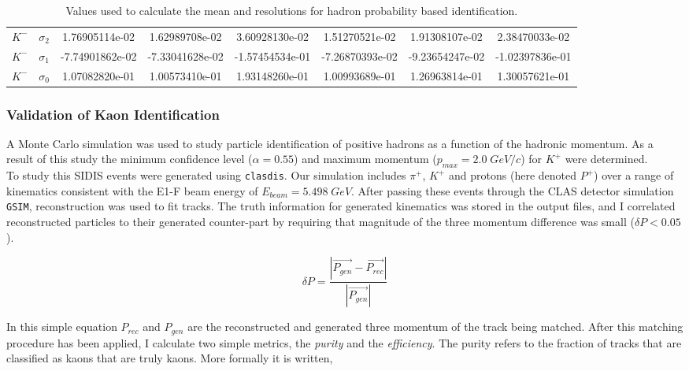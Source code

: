 \begin{landscape}
\begin{table}
\begin{tabular}{c|c|c|c|c|c|c|c}
    $K^-$ & $\sigma_2$ & 1.76905114e-02 &     1.62989708e-02 &     3.60928130e-02 &     1.51270521e-02 &     1.91308107e-02 &     2.38470033e-02 \\
    $K^-$ & $\sigma_1$ & -7.74901862e-02 &    -7.33041628e-02 &    -1.57454534e-01 &    -7.26870393e-02 &     -9.23654247e-02 &    -1.02397836e-01 \\
    $K^-$ & $\sigma_0$ & 1.07082820e-01 &     1.00573410e-01 &     1.93148260e-01 &     1.00993689e-01 &     1.26963814e-01 &     1.30057621e-01
  \end{tabular}
  \caption{Values used to calculate the mean and resolutions for hadron probability based identification.}
  \label{table-hadron-pdfs}
  \end{table}
\end{landscape}

%
%

\subsubsection{Validation of Kaon Identification}
A Monte Carlo simulation was used to study particle identification of positive hadrons as a function of the hadronic momentum.  As a result of this study the minimum confidence level ($\alpha = 0.55$) and maximum momentum ($p_{max} = 2.0 \; GeV/c$) for $K^+$ were determined. \\

To study this SIDIS events were generated using \texttt{clasdis}.  Our simulation includes $\pi^+$, $K^+$ and protons (here denoted $P^+$) over a range of kinematics consistent with the E1-F beam energy of $E_{beam} = 5.498 \; GeV$.  After passing these events through the CLAS detector simulation \texttt{GSIM}, reconstruction was used to fit tracks.  The truth information for generated kinematics was stored in the output files, and I correlated reconstructed particles to their generated counter-part by requiring that magnitude of the three momentum difference was small ($\delta P < 0.05$).

\begin{equation}
	\delta P = \frac{|\vec{P_{gen}} - \vec{P_{rec}}|}{|\vec{P_{gen}}|}
\end{equation}   

In this simple equation $P_{rec}$ and $P_{gen}$ are the reconstructed and generated three momentum of the track being matched.  After this matching procedure has been applied, I calculate two simple metrics, the \textit{purity} and the \textit{efficiency}.  The purity refers to the fraction of tracks that are classified as kaons that are truly kaons.  More formally it is written, 

